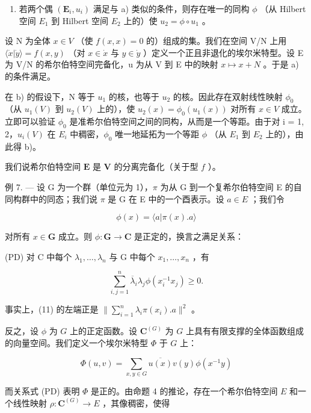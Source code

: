 \begin{enumerate}
\def\labelenumi{\alph{enumi})}
\setcounter{enumi}{1}
\tightlist
\item
  若两个偶 \((\mathbf{E}_{i}, u_{i})\) 满足与 a) 类似的条件，则存在唯一的同构 \(\phi\) （从 Hilbert 空间 \(E_{1}\) 到 Hilbert 空间 \(E_{2}\) 上的）使 \(u_{2} = \phi \circ u_{1}\) 。
\end{enumerate}

设 N 为全体 \(x \in V\) （使 \(f(x, x) = 0\) 的）组成的集。我们在空间 V/N 上用 \(\langle \dot{x} | \dot{y} \rangle = f(x, y)\) （对 \(x \in \dot{x}\) 与 \(y \in \dot{y}\) ）定义一个正且非退化的埃尔米特型。设 E 为 V/N 的希尔伯特空间完备化，u 为从 V 到 E 中的映射 \(x \mapsto x + N\) 。于是 a) 的条件满足。

在 b) 的假设下，N 等于 \(u_{1}\) 的核，也等于 \(u_{2}\) 的核。因此存在双射线性映射 \(\phi_{0}\) （从 \(u_{1}(V)\) 到 \(u_{2}(V)\) 上的），使 \(u_{2}(x) = \phi_{0}(u_{1}(x))\) 对所有 \(x \in V\) 成立。立即可以验证 \(\phi_{0}\) 是准希尔伯特空间之间的同构，从而是一个等距。由于对 i = 1, 2，\(u_{i}(V)\) 在 \(E_{i}\) 中稠密，\(\phi_{0}\) 唯一地延拓为一个等距 \(\phi\) （从 \(E_{1}\) 到 \(E_{2}\) 上的），由此得 b)。

我们说希尔伯特空间 \(\mathbf{E}\) 是 \(\mathbf{V}\) 的分离完备化（关于型 \(f\) ）。

例 7. --- 设 G 为一个群（单位元为 1），\(\pi\) 为从 G 到一个复希尔伯特空间 E 的自同构群中的同态；我们说 \(\pi\) 是 G 在 E 中的一个酉表示。设 \(a \in E\) ；我们令

\[
\phi (x) = \langle a | \pi (x). a \rangle
\]

对所有 \(x \in \mathbf{G}\) 成立。则 \(\phi : \mathbf{G} \to \mathbf{C}\) 是正定的，换言之满足关系：

(PD) 对 C 中每个 \(\lambda_{1},\ldots,\lambda_{n}\) 与 G 中每个 \(x_{1},\ldots,x_{n}\) ，有

\[
\sum_ {i, j = 1} ^ {n} \overline {{\lambda}} _ {i} \lambda_ {j} \phi (x _ {i} ^ {- 1} x _ {j}) \geqslant 0.\tag{11}
\]

事实上，(11) 的左端正是 \(\| \sum_{i=1}^{n} \lambda_i \pi(x_i). a \|^2\) 。

反之，设 \(\phi\) 为 \(G\) 上的正定函数。设 \(\mathbf{C}^{(G)}\) 为 \(G\) 上具有有限支撑的全体函数组成的向量空间。我们定义一个埃尔米特型 \(\Phi\) 于 \(G\) 上：

\[
\Phi (u, v) = \sum_ {x, y \in G} \overline {{u (x)}} v (y) \phi (x ^ {- 1} y)\tag{12}
\]

而关系式 (PD) 表明 \(\Phi\) 是正的。由命题 4 的推论，存在一个希尔伯特空间 \(E\) 和一个线性映射 \(\rho : \mathbf{C}^{(G)} \to E\) ，其像稠密，使得

